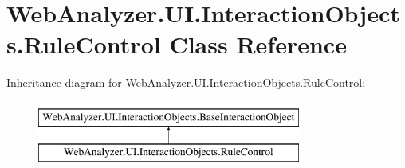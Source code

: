 \hypertarget{class_web_analyzer_1_1_u_i_1_1_interaction_objects_1_1_rule_control}{}\section{Web\+Analyzer.\+U\+I.\+Interaction\+Objects.\+Rule\+Control Class Reference}
\label{class_web_analyzer_1_1_u_i_1_1_interaction_objects_1_1_rule_control}
Inheritance diagram for Web\+Analyzer.\+U\+I.\+Interaction\+Objects.\+Rule\+Control\+:\begin{figure}[H]
\begin{center}
\leavevmode
\includegraphics[height=2.000000cm]{class_web_analyzer_1_1_u_i_1_1_interaction_objects_1_1_rule_control}
\end{center}
\end{figure}
